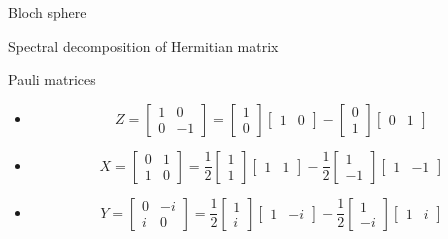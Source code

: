 \documentclass{beamer}
\begin{document}
\begin{frame}{Bloch sphere}
\end{frame}

\begin{frame}{Spectral decomposition of Hermitian matrix}
\end{frame}

\begin{frame}{Pauli matrices}
\begin{itemize}
\setlength{\itemsep}{3em}
\item 
\begin{equation*}
Z=\begin{bmatrix}1&0\\0&-1\end{bmatrix}=
\begin{bmatrix}1\\0\end{bmatrix}\begin{bmatrix}1&0\end{bmatrix}
-\begin{bmatrix}0\\1\end{bmatrix}\begin{bmatrix}0&1\end{bmatrix}
\end{equation*}
\item 
\begin{equation*}
X=\begin{bmatrix}0&1\\1&0\end{bmatrix}=
\frac12\begin{bmatrix}1\\1\end{bmatrix}\begin{bmatrix}1&1\end{bmatrix}
-\frac12\begin{bmatrix}1\\-1\end{bmatrix}\begin{bmatrix}1&-1\end{bmatrix}
\end{equation*}
\item 
\begin{equation*}
Y=\begin{bmatrix}0&-i\\i&0\end{bmatrix}=
\frac12\begin{bmatrix}1\\i\end{bmatrix}\begin{bmatrix}1&-i\end{bmatrix}
-\frac12\begin{bmatrix}1\\-i\end{bmatrix}\begin{bmatrix}1&i\end{bmatrix}
\end{equation*}
\end{itemize}
\end{frame}
\end{document}
